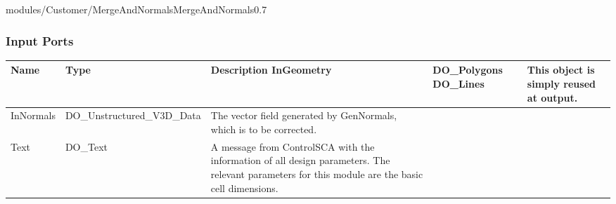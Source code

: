 \begin{htmlonly}
%
\begin{covimg2}{modules/Customer/MergeAndNormals}{MergeAndNormals}{0.7}\end{covimg2}



%
%

%
%





%
\subsubsection{Input Ports}
%


\begin{longtable}{|p{2.5cm}|p{4.5cm}|p{7cm}|}
\hline
   \bf{Name} & \bf{Type} & \bf{Description} \endhead
\hline\hline
	\textcolor{required}{InGeometry} & DO\_Polygons DO\_Lines & 
                 This object is simply reused at output.\\
\hline
	\textcolor{required}{InNormals} & DO\_Unstructured\_V3D\_Data & 
                    The vector field generated by GenNormals,
                    which is to be corrected.\\
\hline
	\textcolor{required}{Text} & DO\_Text & 
                    A message from ControlSCA with the information
                    of all design parameters. The relevant
                    parameters for this module are the basic
                    cell dimensions.\\
                     

\end{longtable}
\end{htmlonly}
